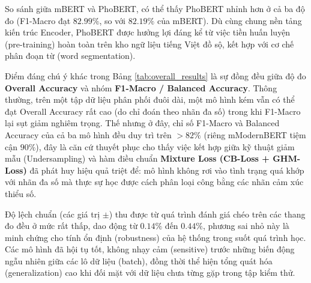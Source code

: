 So sánh giữa mBERT và PhoBERT, có thể thấy PhoBERT nhỉnh hơn ở cả ba độ đo (F1-Macro đạt $82.99\%$, so với $82.19\%$ của mBERT). Dù cùng chung nền tảng kiến trúc Encoder, PhoBERT được hưởng lợi đáng kể từ việc tiền huấn luyện (pre-training) hoàn toàn trên kho ngữ liệu tiếng Việt đồ sộ, kết hợp với cơ chế phân đoạn từ (word segmentation).

Điểm đáng chú ý khác trong Bảng \ref{tab:overall_results} là sự đồng đều giữa độ đo \textbf{Overall Accuracy} và nhóm \textbf{F1-Macro / Balanced Accuracy}. Thông thường, trên một tập dữ liệu phân phối đuôi dài, một mô hình kém vẫn có thể đạt Overall Accuracy rất cao (do chỉ đoán theo nhãn đa số) trong khi F1-Macro lại sụt giảm nghiêm trọng. Thế nhưng ở đây, chỉ số F1-Macro và Balanced Accuracy của cả ba mô hình đều duy trì trên $>82\%$ (riêng mModernBERT tiệm cận $90\%$), đây là căn cứ thuyết phục cho thấy việc kết hợp giữa kỹ thuật giảm mẫu (Undersampling) và hàm điều chuẩn \textbf{Mixture Loss (CB-Loss + GHM-Loss)} đã phát huy hiệu quả triệt để: mô hình không rơi vào tình trạng quá khớp với nhãn đa số mà thực sự học được cách phân loại công bằng các nhãn cảm xúc thiểu số.

Độ lệch chuẩn (các giá trị $\pm$) thu được từ quá trình đánh giá chéo trên các thang đo đều ở mức rất thấp, dao động từ $0.14\%$ đến $0.44\%$, phương sai nhỏ này là minh chứng cho tính ổn định (robustness) của hệ thống trong suốt quá trình học. Các mô hình đã hội tụ tốt, không nhạy cảm (sensitive) trước những biến động ngẫu nhiên giữa các lô dữ liệu (batch), đồng thời thể hiện tổng quát hóa (generalization) cao khi đối mặt với dữ liệu chưa từng gặp trong tập kiểm thử.
